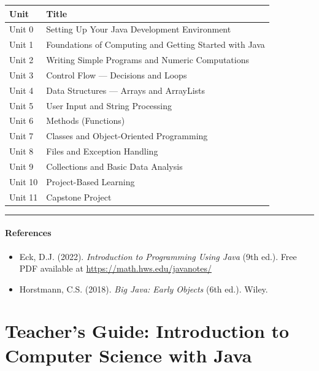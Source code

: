 \documentclass[
  justified,
  openright,
]{tufte-book}
\let\subsection\paragraph
\let\paragraph\paragraph
\let\subsection\paragraph
\let\paragraph\paragraph
\providecommand{\tightlist}{%
  \setlength{\itemsep}{0pt}\setlength{\parskip}{0pt}}
\begin{document}
\begin{fullwidth}{\def\LTcaptype{none} %
\begin{longtable}[]{@{}ll@{}}
\toprule\noalign{}
Unit & Title \\
\midrule\noalign{}
\endhead
\bottomrule\noalign{}
\endlastfoot
Unit 0 & Setting Up Your Java Development Environment \\
Unit 1 & Foundations of Computing and Getting Started with Java \\
Unit 2 & Writing Simple Programs and Numeric Computations \\
Unit 3 & Control Flow --- Decisions and Loops \\
Unit 4 & Data Structures --- Arrays and ArrayLists \\
Unit 5 & User Input and String Processing \\
Unit 6 & Methods (Functions) \\
Unit 7 & Classes and Object-Oriented Programming \\
Unit 8 & Files and Exception Handling \\
Unit 9 & Collections and Basic Data Analysis \\
Unit 10 & Project-Based Learning \\
Unit 11 & Capstone Project \\
\end{longtable}
}
\end{fullwidth}

\begin{center}\rule{0.5\linewidth}{0.5pt}\end{center}

\subsection{References}\label{references-1}

\begin{itemize}
\tightlist
\item
  Eck, D.J. (2022). \emph{Introduction to Programming Using Java} (9th
  ed.). Free PDF available at \url{https://math.hws.edu/javanotes/}
\item
  Horstmann, C.S. (2018). \emph{Big Java: Early Objects} (6th ed.).
  Wiley.
\end{itemize}

\newpage

\section{Teacher's Guide: Introduction to Computer Science with
Java}\label{teachers-guide-introduction-to-computer-science-with-java}
\end{document}
